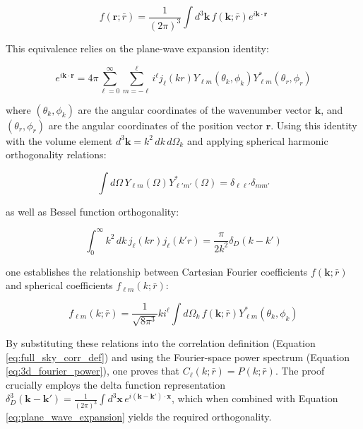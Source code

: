 \begin{equation}
f(\mathbf{r}; \bar{r}) = \frac{1}{(2\pi)^3} \int d^3\mathbf{k} \, f(\mathbf{k}; \bar{r}) e^{i\mathbf{k} \cdot \mathbf{r}}
\label{eq:3d_fourier_expansion}
\end{equation}

This equivalence relies on the plane-wave expansion identity:

\begin{equation}
e^{i\mathbf{k} \cdot \mathbf{r}} = 4\pi \sum_{\ell=0}^\infty \sum_{m=-\ell}^\ell i^\ell j_\ell(kr) Y_{\ell m}(\theta_k, \phi_k) Y_{\ell m}^*(\theta_r, \phi_r)
\label{eq:plane_wave_expansion}
\end{equation}

where $(\theta_k, \phi_k)$ are the angular coordinates of the wavenumber vector $\mathbf{k}$, and $(\theta_r, \phi_r)$ are the angular coordinates of the position vector $\mathbf{r}$. Using this identity with the volume element $d^3\mathbf{k} = k^2 \, dk \, d\Omega_k$ and applying spherical harmonic orthogonality relations:

\begin{equation}
\int d\Omega \, Y_{\ell m}(\Omega) Y_{\ell' m'}^*(\Omega) = \delta_{\ell\ell'} \delta_{m m'}
\label{eq:sh_orthogonality}
\end{equation}

as well as Bessel function orthogonality:

\begin{equation}
\int_0^\infty k^2 \, dk \, j_\ell(kr) j_\ell(k'r) = \frac{\pi}{2k^2} \delta_D(k - k')
\label{eq:bessel_orthogonality}
\end{equation}

one establishes the relationship between Cartesian Fourier coefficients $f(\mathbf{k}; \bar{r})$ and spherical coefficients $f_{\ell m}(k; \bar{r})$:

\begin{equation}
f_{\ell m}(k; \bar{r}) = \frac{1}{\sqrt{8\pi^3}} k i^\ell \int d\Omega_k \, f(\mathbf{k}; \bar{r}) Y_{\ell m}^*(\theta_k, \phi_k)
\label{eq:cartesian_to_spherical}
\end{equation}

By substituting these relations into the correlation definition (Equation \ref{eq:full_sky_corr_def}) and using the Fourier-space power spectrum (Equation \ref{eq:3d_fourier_power}), one proves that $C_\ell(k; \bar{r}) = P(k; \bar{r})$. The proof crucially employs the delta function representation $\delta_D^3(\mathbf{k} - \mathbf{k}') = \frac{1}{(2\pi)^3} \int d^3\mathbf{x} \, e^{i(\mathbf{k} - \mathbf{k}') \cdot \mathbf{x}}$, which when combined with Equation \ref{eq:plane_wave_expansion} yields the required orthogonality.


